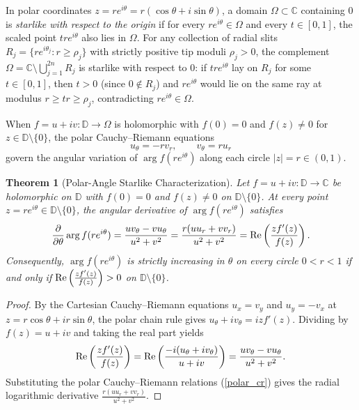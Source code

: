 \documentclass[11pt,reqno]{amsart}
\newtheorem{thm}{Theorem}[section]
\numberwithin{equation}{section}
\newcommand{\D}{\mathbb{D}}
\newcommand{\C}{\mathbb{C}}
\newcommand{\re}{\mbox{\rm Re\,}}
\begin{document}
In polar coordinates $z = r e^{i\theta} = r(\cos\theta + i\sin\theta)$, a domain $\varOmega \subset \C$ containing $0$ is \emph{starlike with respect to the origin} if for every $r e^{i\theta} \in \varOmega$ and every $t \in [0, 1]$, the scaled point $t r e^{i\theta}$ also lies in $\varOmega$. For any collection of radial slits $R_j = \{r e^{i\theta_j} : r \ge \rho_j\}$ with strictly positive tip moduli $\rho_j > 0$, the complement $\varOmega = \C \setminus \bigcup_{j=1}^{2n} R_j$ is starlike with respect to $0$: if $t r e^{i\theta}$ lay on $R_j$ for some $t \in [0, 1]$, then $t > 0$ (since $0 \notin R_j$) and $r e^{i\theta}$ would lie on the same ray at modulus $r \ge t r \ge \rho_j$, contradicting $r e^{i\theta} \in \varOmega$.

When $f = u + iv : \D \to \varOmega$ is holomorphic with $f(0) = 0$ and $f(z) \ne 0$ for $z \in \D \setminus \{0\}$, the polar Cauchy--Riemann equations
\begin{equation} \label{polar_cr}
  u_\theta = -r v_r, \qquad v_\theta = r u_r
\end{equation}
govern the angular variation of $\arg f(re^{i\theta})$ along each circle $|z| = r \in (0, 1)$.

\begin{thm}[Polar-Angle Starlike Characterization] \label{thm_starlike_logderiv}
Let $f = u + iv : \D \to \C$ be holomorphic on $\D$ with $f(0) = 0$ and $f(z) \ne 0$ on $\D \setminus \{0\}$. At every point $z = r e^{i\theta} \in \D \setminus \{0\}$, the angular derivative of $\arg f(re^{i\theta})$ satisfies
\begin{equation} \label{eq_arg_polar_deriv}
  \frac{\partial}{\partial\theta}\arg f(re^{i\theta})
  = \frac{u v_\theta - v u_\theta}{u^2 + v^2}
  = \frac{r(u u_r + v v_r)}{u^2 + v^2}
  = \re\!\left(\frac{z f'(z)}{f(z)}\right).
\end{equation}
Consequently, $\arg f(re^{i\theta})$ is strictly increasing in $\theta$ on every circle $0 < r < 1$ if and only if $\re\!\left(\frac{z f'(z)}{f(z)}\right) > 0$ on $\D \setminus \{0\}$.
\end{thm}
\begin{proof}
By the Cartesian Cauchy--Riemann equations $u_x = v_y$ and $u_y = -v_x$ at $z = r\cos\theta + i r\sin\theta$, the polar chain rule gives $u_\theta + i v_\theta = i z f'(z)$. Dividing by $f(z) = u + iv$ and taking the real part yields
\[
  \re\!\left(\frac{z f'(z)}{f(z)}\right) = \re\!\left(\frac{-i(u_\theta + i v_\theta)}{u + iv}\right) = \frac{u v_\theta - v u_\theta}{u^2 + v^2}.
\]
Substituting the polar Cauchy--Riemann relations (\ref{polar_cr}) gives the radial logarithmic derivative $\frac{r(u u_r + v v_r)}{u^2 + v^2}$.
\end{proof}
\end{document}
